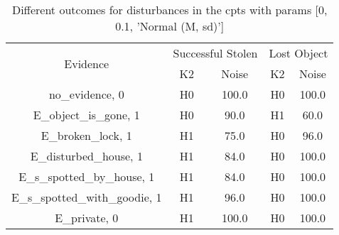 \begin{table}\begin{tabular}{c|cc|cc}\toprule\multirow{2}{*}{Evidence} & \multicolumn{2}{c}{Successful Stolen} & \multicolumn{2}{c}{Lost Object} \\& {K2} & {Noise} & {K2} & {Noise} \\\midrule
no\_evidence, 0 & H0&100.0&H0&100.0\\E\_object\_is\_gone, 1 & \cellcolor{Bittersweet}H0&\cellcolor{Bittersweet}90.0&\cellcolor{Bittersweet}H1&\cellcolor{Bittersweet}60.0\\E\_broken\_lock, 1 & \cellcolor{Bittersweet}H1&\cellcolor{Bittersweet}75.0&H0&96.0\\E\_disturbed\_house, 1 & \cellcolor{Bittersweet}H1&\cellcolor{Bittersweet}84.0&H0&100.0\\E\_s\_spotted\_by\_house, 1 & \cellcolor{Bittersweet}H1&\cellcolor{Bittersweet}84.0&H0&100.0\\E\_s\_spotted\_with\_goodie, 1 & H1&96.0&H0&100.0\\E\_private, 0 & H1&100.0&H0&100.0\\\bottomrule\end{tabular}\caption{Different outcomes for disturbances in the cpts with params [0, 0.1, 'Normal (M, sd)']}\end{table}